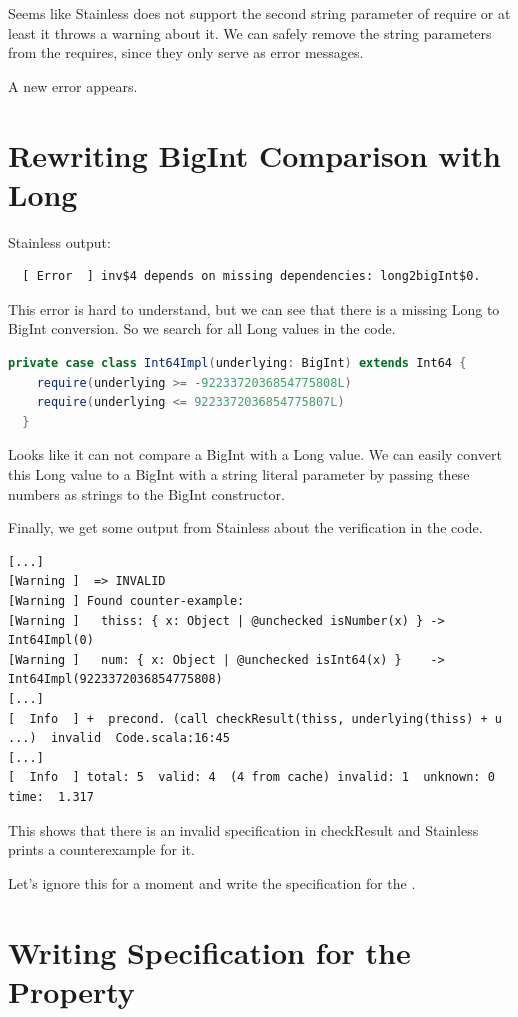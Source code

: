 Seems like Stainless does not support the second string parameter of require or at least it throws a warning about it.
We can safely remove the string parameters from the requires, since they only serve as error messages.

A new error appears.


\section{Rewriting BigInt Comparison with Long}

Stainless output:
{\footnotesize\begin{verbatim}
  [ Error  ] inv$4 depends on missing dependencies: long2bigInt$0.
\end{verbatim}}

This error is hard to understand, but we can see that there is a missing Long to BigInt conversion.
So we search for all Long values in the code.
\begin{lstlisting}[language=scala]
  private case class Int64Impl(underlying: BigInt) extends Int64 {
    require(underlying >= -9223372036854775808L)
    require(underlying <= 9223372036854775807L)
  }
\end{lstlisting}

Looks like it can not compare a BigInt with a Long value.
We can easily convert this Long value to a BigInt with a string literal parameter by passing these numbers as strings to the BigInt constructor.

Finally, we get some output from Stainless about the verification in the code.
{\footnotesize\begin{verbatim}
[...]
[Warning ]  => INVALID
[Warning ] Found counter-example:
[Warning ]   thiss: { x: Object | @unchecked isNumber(x) } -> Int64Impl(0)
[Warning ]   num: { x: Object | @unchecked isInt64(x) }    -> Int64Impl(9223372036854775808)
[...]
[  Info  ] +  precond. (call checkResult(thiss, underlying(thiss) + u ...)  invalid  Code.scala:16:45
[...]
[  Info  ] total: 5  valid: 4  (4 from cache) invalid: 1  unknown: 0  time:  1.317
\end{verbatim}}

This shows that there is an invalid specification in checkResult and Stainless prints a counterexample for it.

Let's ignore this for a moment and write the specification for the .


\section{Writing Specification for the Property}

